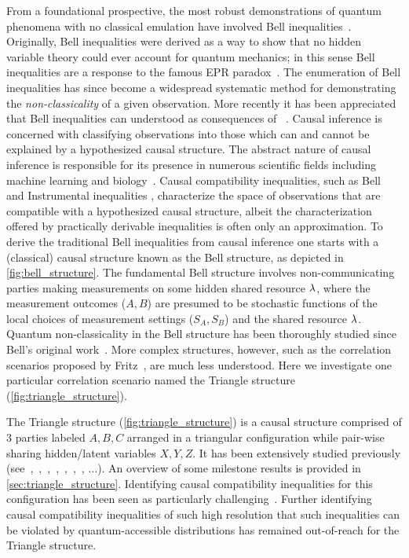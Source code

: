 \documentclass[aps, 10pt, english, twoside, pra, nofootinbib, tightenlines, longbibliography, superscriptaddress]{revtex4-1}
\begin{document}
    From a foundational prospective, the most robust demonstrations of quantum phenomena with no classical emulation have involved Bell inequalities~\cite{Bell_1964,Brunner_2013}. Originally, Bell inequalities were derived as a way to show that no hidden variable theory could ever account for quantum mechanics; in this sense Bell inequalities are a response to the famous EPR paradox~\cite{EPR_Orig}. The enumeration of Bell inequalities has since become a widespread systematic method for demonstrating the \textit{non-classicality} of a given observation. More recently it has been appreciated that Bell inequalities can understood as consequences of ~\cite{Wood_2012}. Causal inference is concerned with classifying observations into those which can and cannot be explained by a hypothesized causal structure. The abstract nature of causal inference is responsible for its presence in numerous scientific fields including machine learning and biology~\cite{Pearl_2009,Pearl_2009_tr}. Causal compatibility inequalities, such as Bell and Instrumental inequalities \cite{pearl1995instrumental,bonet2001instrumental,evans2012graphical}, characterize the space of observations that are compatible with a hypothesized causal structure, albeit the characterization offered by practically derivable inequalities is often only an approximation. To derive the traditional Bell inequalities from causal inference one starts with a (classical) causal structure known as the Bell structure, as depicted in \cref{fig:bell_structure}. The fundamental Bell structure involves non-communicating parties making measurements on some hidden shared resource $\lambda$, where the measurement outcomes ($A, B$) are presumed to be stochastic functions of the local choices of measurement settings ($S_A, S_B$) and the shared resource $\lambda$. Quantum non-classicality in the Bell structure has been thoroughly studied since Bell's original work~\cite{Brunner_2013}. More complex structures, however, such as the correlation scenarios proposed by Fritz~\cite{Fritz_2012,Fritz_2014}, are much less understood. Here we investigate one particular correlation scenario named the Triangle structure (\cref{fig:triangle_structure}).

    The Triangle structure (\cref{fig:triangle_structure}) is a causal structure comprised of $3$ parties labeled $A, B, C$ arranged in a triangular configuration while pair-wise sharing hidden/latent variables $X, Y, Z$. It has been extensively studied previously (see~\cite[Fig. 1]{Steudel_2010},~\cite[Fig. 6]{Chaves_2014},~\cite[Fig. 8]{Branciard_2012},~\cite[Fig. 8, App. E]{Henson_2014},~\cite[Fig. 3]{Fritz_2012},~\cite[Fig. 4]{Weilenmann_2016},~\cite[Fig. 1]{Inflation}, $\ldots$). An overview of some milestone results is provided in \cref{sec:triangle_structure}. Identifying causal compatibility inequalities for this configuration has been seen as particularly challenging~\cite{Branciard_2012}. Further identifying causal compatibility inequalities of such high resolution that such inequalities can be violated by quantum-accessible distributions has remained out-of-reach for the Triangle structure.
\end{document}
